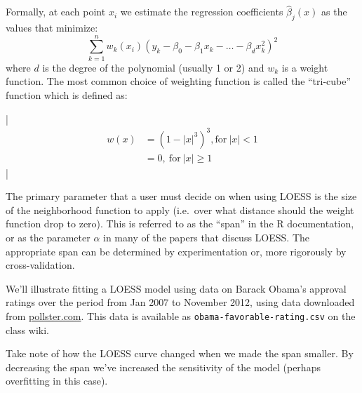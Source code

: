 Formally, at each point $x_i$ we estimate the regression coefficients
$\hat{\beta}_j(x)$ as the values that minimize:
\[\sum_{k=1}^n w_k(x_i)(y_k - \beta_0 - \beta_1 x_k - \ldots - \beta_d x_k^2)^2\]
where $d$ is the degree of the polynomial (usually 1 or 2) and $w_k$ is
a weight function. The most common choice of weighting function is
called the ``tri-cube'' function which is defined as:

\lstDeleteShortInline|
\begin{align*}
 w(x) & = (1-|x|^3)^3, \mbox{for}\ |x| < 1  \\
      & = 0,\ \mbox{for}\ |x| \geq 1
\end{align*}
\lstMakeShortInline|



The primary parameter that a user must decide on when using LOESS is the
size of the neighborhood function to apply (i.e.~over what distance
should the weight function drop to zero). This is referred to as the
``span'' in the R documentation, or as the parameter $\alpha$ in many of
the papers that discuss LOESS. The appropriate span can be determined by
experimentation or, more rigorously by cross-validation.

We'll illustrate fitting a LOESS model using data on Barack Obama's
approval ratings over the period from Jan 2007 to November 2012, using data downloaded from \url{pollster.com}. This data is available as  \lstinline!obama-favorable-rating.csv! on the class wiki.
%
Take note of how the LOESS curve changed when we made the span smaller.
By decreasing the span we've increased the sensitivity of the model
(perhaps overfitting in this case).

